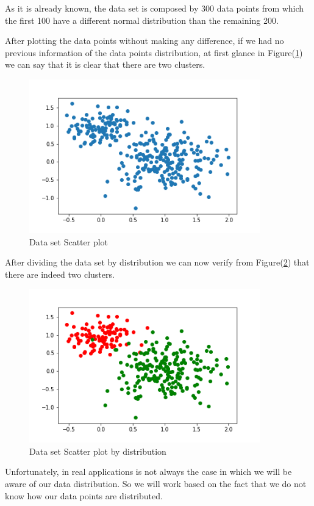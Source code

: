\documentclass[11pt]{article}
\begin{document}
As it is already known, the data set is composed by 300 data points from which the first 100 have a different normal distribution than the remaining 200.

After plotting the data points without making any difference, if we had no previous information of the data points distribution, at first glance in Figure(\ref{fig:1}) we can say that it is clear that there are two clusters. \\

\begin{figure}[h!]
	\includegraphics[width=100mm,scale=0.5]{scatter_plot.png}
	\caption{Data set Scatter plot}
	\label{fig:1}
\end{figure}

After dividing the data set by distribution we can now verify from Figure(\ref{fig:2}) that there are indeed two clusters.\\

\begin{figure}[h!]
	\includegraphics[width=100mm,scale=0.5]{scatter_plot_clusters_diff.png}
		\caption{Data set Scatter plot by distribution}
	\label{fig:2}
\end{figure}

Unfortunately, in real applications is not always the case in which we will be aware of our data distribution. So we will work based on the fact that we do not know how our data points are distributed.
\end{document}

